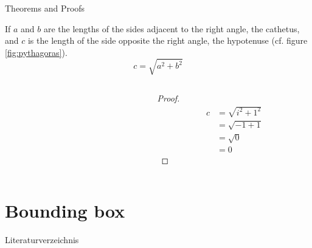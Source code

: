 \documentclass[%
  handout,
  aspectratio=1610,
  10pt,
  onlytextwidth, %
]{beamer}
\begin{document}
\begin{frame}{Theorems and Proofs}
  \begin{theorem}
    If $a$ and $b$ are the lengths of the sides adjacent to the right angle, the cathetus, and $c$ is the length of the side opposite the right angle, the hypotenuse (cf. figure \ref{fig:pythagoras}).
    \begin{equation*}\label{eq:pythagoras}
      c = \sqrt{a^2 + b^2}
    \end{equation*}
  \end{theorem}

  \begin{columns}
    \begin{column}{0.5\textwidth}
      \begin{figure}
      \end{figure}
    \end{column}
    \begin{column}{0.5\textwidth}
      \begin{proof}
        \begin{displaymath}
          \begin{aligned}
            c & = \sqrt{i^2+1^2} \\
              & = \sqrt{-1 + 1}  \\
              & = \sqrt{0}       \\
              & = 0
          \end{aligned}
        \end{displaymath}
      \end{proof}
    \end{column}
  \end{columns}
\end{frame}

\section{Bounding box}

\begin{frame}
  \centering
\end{frame}

\begin{frame}{Literaturverzeichnis}
  \printbibliography
\end{frame}

\end{document}
